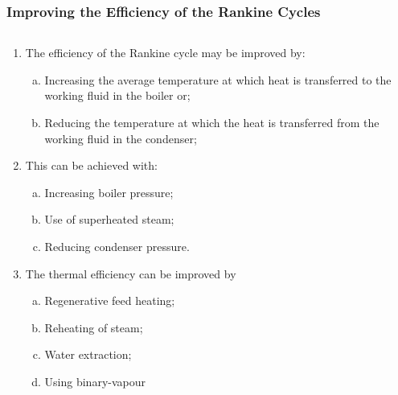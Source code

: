 \documentclass[10pt,compress]{beamer}
\begin{document}
\begin{frame}
 \frametitle{Improving the Efficiency of the Rankine Cycles}
   \begin{columns}
      \begin{column}[c]{0.5\linewidth}
         \begin{enumerate}\scriptsize
            \item<1-> The efficiency of the Rankine cycle may be improved by:
              \begin{enumerate}[(a)]\scriptsize
                 \item <1-> Increasing the average temperature at which heat is transferred to the working fluid in the boiler or;
                 \item <1-> Reducing the temperature at which the heat is transferred from the working fluid in the condenser;
              \end{enumerate} 
            \item <2-> This can be achieved with:
              \begin{enumerate}[(a)]\scriptsize
                 \item <2-> Increasing boiler pressure;
                 \item <2-> Use of superheated steam;
                 \item <2-> Reducing condenser pressure.
              \end{enumerate}
            \item <3-> The thermal efficiency can be improved by
              \begin{enumerate}[(a)]\scriptsize
                 \item <3-> Regenerative feed heating;
                 \item <3-> Reheating of steam;
                 \item <3-> Water extraction;
                 \item <3-> Using binary-vapour
              \end{enumerate}
         \end{enumerate}  
      \end{column}
      \begin{column}[c]{0.5\linewidth}
\end{column}
\end{columns}
\end{frame}
\end{document}
